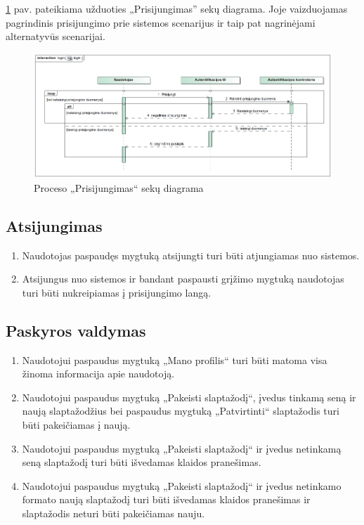 \documentclass{VUMIFPSkursinis}
\begin{document}
\ref{fig:login} pav. pateikiama užduoties „Prisijungimas” sekų diagrama. Joje vaizduojamas pagrindinis prisijungimo prie sistemos scenarijus ir taip pat nagrinėjami alternatyvūs scenarijai.
\begin{figure}[H]
	\centering
	\includegraphics[width=\linewidth]{img/login.jpg}
	\caption{Proceso „Prisijungimas“ sekų diagrama}
	\label{fig:login}
\end{figure}

\subsection{Atsijungimas}
\begin{enumerate}[label=FR3.\arabic*] 
	\item Naudotojas paspaudęs mygtuką atsijungti turi būti atjungiamas
	nuo sistemos.
	\item Atsijungus nuo sistemos ir bandant paspausti grįžimo mygtuką naudotojas turi būti nukreipiamas į prisijungimo langą.
\end{enumerate}
\subsection{Paskyros valdymas}
\begin{enumerate}[label=FR4.\arabic*] 
	\item Naudotojui paspaudus mygtuką „Mano profilis“ turi būti matoma visa žinoma informacija apie naudotoją.
	\item Naudotojui paspaudus mygtuką „Pakeisti slaptažodį“,
	įvedus tinkamą seną ir naują slaptažodžius bei paspaudus
	mygtuką „Patvirtinti“ slaptažodis turi būti pakeičiamas į naują.
	\item Naudotojui paspaudus mygtuką „Pakeisti slaptažodį“ ir
	įvedus netinkamą seną slaptažodį turi būti išvedamas klaidos pranešimas.
	\item Naudotojui paspaudus mygtuką „Pakeisti slaptažodį“ ir
	įvedus netinkamo formato naują slaptažodį turi būti išvedamas klaidos pranešimas ir slaptažodis neturi būti pakeičiamas nauju.
\end{enumerate}
\end{document}
